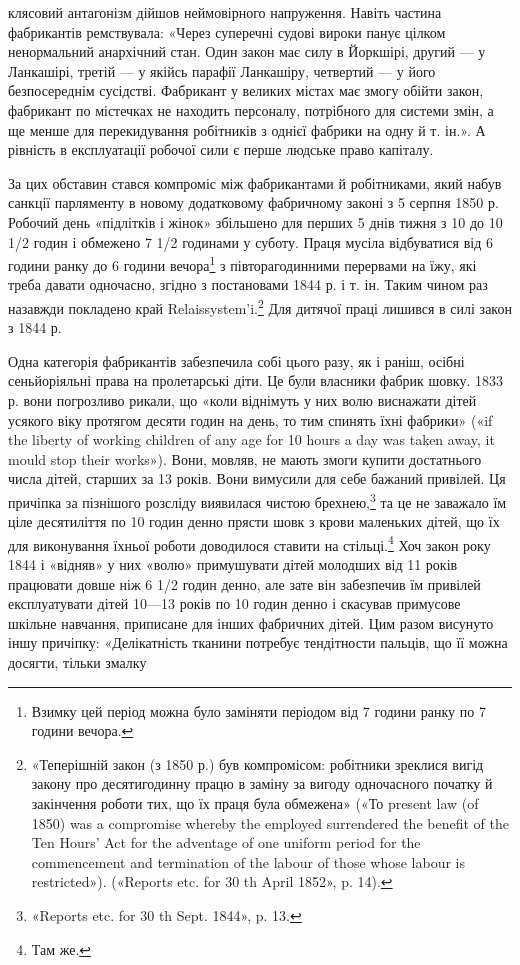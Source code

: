 \parcont{}  %
клясовий антагонізм дійшов неймовірного напруження. Навіть
частина фабрикантів ремствувала: «Через суперечні судові
вироки панує цілком ненормальний анархічний стан. Один закон
має силу в Йоркшірі, другий — у Ланкашірі, третій — у якійсь
парафії Ланкашіру, четвертий — у його безпосереднім сусідстві.
Фабрикант у великих містах має змогу обійти закон, фабрикант
по містечках не находить персоналу, потрібного для системи змін,
а ще менше для перекидування робітників з однієї фабрики на
одну й т. ін.». А рівність в експлуатації робочої сили є перше
людське право капіталу.

За цих обставин стався компроміс між фабрикантами й робітниками,
який набув санкції парляменту в новому додатковому
фабричному законі з 5 серпня 1850 р. Робочий день «підлітків
і жінок» збільшено для перших 5 днів тижня з 10 до 10 1/2 годин
і обмежено 7 1/2 годинами у суботу. Праця мусіла відбуватися від
6 години ранку до 6 години вечора\footnote{
Взимку цей період можна було заміняти періодом від 7 години
ранку по 7 години вечора.
} з півторагодинними перервами
на їжу, які треба давати одночасно, згідно з постановами
1844 р. і т. ін. Таким чином раз назавжди покладено край
Relaissystem’i.\footnote{
«Теперішній закон (з 1850 р.) був компромісом: робітники зреклися
вигід закону про десятигодинну працю в заміну за вигоду одночасного
початку й закінчення роботи тих, що їх праця була обмежена» («То
present law (of 1850) was a compromise whereby the employed surrendered
the benefit of the Ten Hours’ Act for the adventage of one uniform period
for the commencement and termination of the labour of those whose labour
is restricted»). («Reports etc. for 30 th April 1852», p. 14).
} Для дитячої праці лишився в силі закон з
1844 р.

Одна категорія фабрикантів забезпечила собі цього разу,
як і раніш, осібні сеньйоріяльні права на пролетарські діти. Це
були власники фабрик шовку. 1833 р. вони погрозливо рикали,
що «коли віднімуть у них волю виснажати дітей усякого віку
протягом десяти годин на день, то тим спинять їхні фабрики»
(«if the liberty of working children of any age for 10 hours a day
was taken away, it mould stop their works»). Вони, мовляв, не
мають змоги купити достатнього числа дітей, старших за 13 років.
Вони вимусили для себе бажаний привілей. Ця причіпка за пізнішого
розсліду виявилася чистою брехнею,\footnote{
«Reports etc. for 30 th Sept. 1844», p. 13.
} та це не заважало
їм ціле десятиліття по 10 годин денно прясти шовк з крови
маленьких дітей, що їх для виконування їхньої роботи доводилося
ставити на стільці.\footnote{
Там же.
} Хоч закон року 1844 і «відняв» у них
«волю» примушувати дітей молодших від 11 років працювати
довше ніж 6 1/2 годин денно, але зате він забезпечив їм привілей
експлуатувати дітей 10—13 років по 10 годин денно і скасував
примусове шкільне навчання, приписане для інших фабричних
дітей. Цим разом висунуто іншу причіпку: «Делікатність тканини
потребує тендітности пальців, що її можна досягти, тільки змалку
\parbreak{}  %

